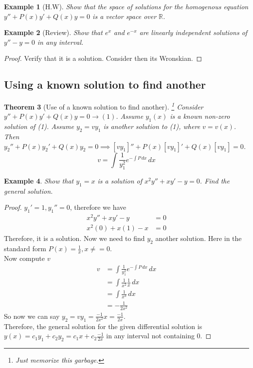 \documentclass[oneside,11pt,pdftex,final]{book}%
\numberwithin{equation}{section}
\newtheorem{theorem}{Theorem}[chapter]%
\newtheorem{example}[theorem]{Example}
\numberwithin{section}{chapter}
\numberwithin{equation}{chapter}
\newcommand{\R}{\mathbb{R}}
\begin{document}
\begin{example}[H.W]
	Show that the space of solutions for the homogenous equation $ y''+P(x)y'+Q(x)y=0 $ is a vector space over $ \R$.
\end{example}

\begin{example}[Review]
	Show that $ e^x $ and $ e^{-x} $ are linearly independent solutions of $ y''-y=0 $ in any interval.
\end{example}
\begin{proof}
	Verify that it is a solution. Consider then its Wronskian.
\end{proof}
\subsection{Using a known solution to find another}
\begin{theorem}[Use of a known solution to find another]\footnote{Just memorize this garbage.}
	Consider $ y''+P(x)y'+Q(x)y=0 \to (1)$. Assume $ y_1(x) $ is a known non-zero solution of (1). Assume $ y_2=v y_1 $ is another solution to (1), where $ v=v(x) $. Then $ y_2''+P(x)y_2'+Q(x)y_2 =0\implies [vy_1]''+P(x)[vy_1]'+Q(x)[vy_1]=0$.\[ v=\int \frac{1}{y_1^2} e^{-\int P\, dx}\, dx\]
\end{theorem}

\begin{example}
	Show that $ y_1=x $ is a solution of $ x^2y''+xy'-y=0 $. Find the general solution.
\end{example}
\begin{proof}
	$ y_1'=1,y_1''=0 $, therefore we have
	\begin{align*}
		x^2y''+xy'-y&=0\\
		x^2(0)+x(1)-x&=0
	\end{align*}
Therefore, it is a solution.
Now we need to find $ y_2 $ another solution. Here in the standard form $ P(x)=\frac{1}{x}, x\neq=0$.\\
Now compute $ v $
\begin{align*}
	v&=\int \frac{1}{y_1^2}e^{-\int P\, dx}\, dx\\
	&= \int \frac{1}{x^2} \frac{1}{x}\, dx\\
	&= \int \frac{1}{x^3}\, dx\\
	&= - \frac{1}{2x^2}
\end{align*}
So now we can say $ y_2=vy_1=\frac{-1}{2x^2}x=\frac{-1}{2x} $.\\
Therefore, the general solution for the given differential solution is $ y(x) = c_1 y_1 + c_2 y_2=c_1 x + c_2 \frac{-1}{2x}$ in any interval not containing $ 0 $.
\end{proof}
\end{document}
